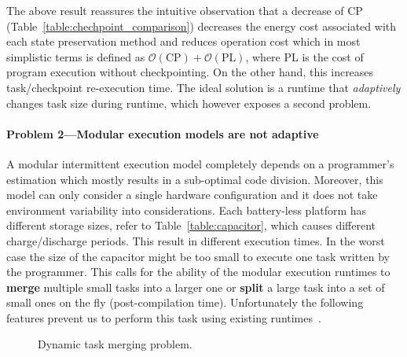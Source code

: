The above result reassures the intuitive observation that a decrease of CP (Table~\ref{table:chechpoint_comparison}) decreases the energy cost associated with each state preservation method and reduces operation cost which in most simplistic terms is defined as $\mathcal{O}(\text{CP})+\mathcal{O}(\text{PL})$, where PL is the cost of program execution without checkpointing. On the other hand, this increases task/checkpoint re-execution time. The ideal solution is a runtime that \emph{adaptively} changes task size during runtime, which however exposes a second problem.

\paragraph{Problem 2---Modular execution models are not adaptive}

A modular intermittent execution model completely depends on a programmer's estimation which mostly results in a sub-optimal code division. Moreover, this model can only consider a single hardware configuration and it does not take environment variability into considerations. Each battery-less platform has different storage sizes, refer to Table~\ref{table:capacitor}, which causes different charge/discharge periods. This result in different execution times. In the worst case the size of the capacitor might be too small to execute one task written by the programmer. This calls for the ability of the modular execution runtimes to \textbf{merge} multiple small tasks into a larger one or \textbf{split} a large task into a set of small ones on the fly (post-compilation time). Unfortunately the following features prevent us to perform this task using existing runtimes~\cite{chain,alpaca}.

\begin{figure}
	\centering
	\caption{Dynamic task merging problem.}
	\label{fig:DynamicChainSeq}
\end{figure}


